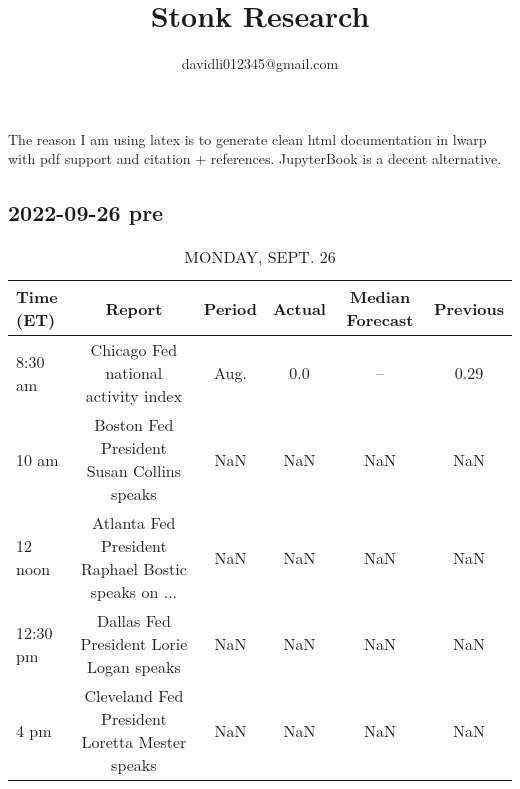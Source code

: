 \documentclass{book}
\title{Stonk Research}
\author{davidli012345@gmail.com}
\begin{document}
\maketitle                      %


 The reason I am using latex is to generate clean html documentation in lwarp with pdf support and citation + references. JupyterBook is a decent alternative.

\tableofcontents                %
\listoffigures
\listoftables


  
  \subsection{ 2022-09-26 pre }
  \normalsize%
  
  
  \begin{table}[htbp]%
  \caption{MONDAY, SEPT. 26}%
  \centering%
  \begin{adjustbox}{width=1\textwidth}%
  \begin{tabular}{lccccc}
  \toprule
  Time (ET) &                                             Report & Period & Actual & Median Forecast & Previous \\
  \midrule
    8:30 am &                Chicago Fed national activity index &   Aug. &    0.0 &              -- &     0.29 \\
      10 am &          Boston Fed President Susan Collins speaks &    NaN &    NaN &             NaN &      NaN \\
    12 noon & Atlanta Fed President Raphael Bostic speaks on ... &    NaN &    NaN &             NaN &      NaN \\
   12:30 pm &            Dallas Fed President Lorie Logan speaks &    NaN &    NaN &             NaN &      NaN \\
       4 pm &      Cleveland Fed President Loretta Mester speaks &    NaN &    NaN &             NaN &      NaN \\
  \bottomrule
  \end{tabular}
  \end{adjustbox}%
  \end{table}
  
  
\end{document}
